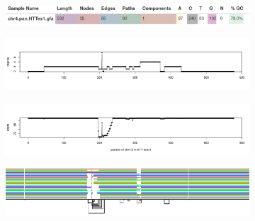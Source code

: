 \begin{figure}[]
    \begin{subfigure}{\linewidth}
        \caption{}
        \centering
        \includegraphics[width=1.0\linewidth, trim=-2.25cm 1.0cm 0cm 3.75cm]{fig/metrics/chr4_pan_HTTex1_gfa_multiqc_odgi_stats_svg}
        \label{fig:metrics-multiqc}
        	\vspace{-2em}
    \end{subfigure}
    \begin{subfigure}{1\linewidth}
        \caption{}
        \centering
        \includegraphics[width=\linewidth,trim=-.225cm 4cm +.425cm +3cm]{fig/metrics/chr4_HTT_chm13_degree_w1_bed}
        \label{fig:metrics-degree}
    \end{subfigure}
    \begin{subfigure}{\linewidth}
        \caption{}
        \centering
        \includegraphics[width=\linewidth,trim=-.225cm 3.3cm +0.425cm +3cm]{fig/metrics/chr4_HTT_chm13_depth_w1_bed}
        \label{fig:metrics-depth}
    \end{subfigure}
    \begin{subfigure}{\linewidth}
        \caption{}
        \centering
        \includegraphics[width=1.0\linewidth, trim=-1.75cm 2.2cm -0.75cm 0.5cm]{fig/metrics/chr4_pan_fa_a2fb268_4030258_6a1ecc2_smooth_gfa_og_HTTex1_og_O_og_tiny_og_png_svg.pdf}

\end{subfigure}
\end{figure}
